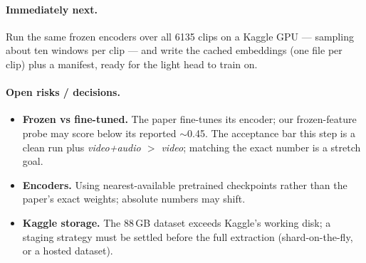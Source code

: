 \documentclass[11pt,a4paper]{article}
\begin{document}
\paragraph{Immediately next.} Run the same frozen encoders over all 6135 clips on a Kaggle
GPU --- sampling about ten windows per clip --- and write the cached embeddings (one file per
clip) plus a manifest, ready for the light head to train on.

\paragraph{Open risks / decisions.}
\begin{itemize}
  \item \textbf{Frozen vs fine-tuned.} The paper fine-tunes its encoder; our frozen-feature
        probe may score below its reported $\sim$0.45. The acceptance bar this step is a clean
        run plus \emph{video+audio $>$ video}; matching the exact number is a stretch goal.
  \item \textbf{Encoders.} Using nearest-available pretrained checkpoints rather than the
        paper's exact weights; absolute numbers may shift.
  \item \textbf{Kaggle storage.} The 88\,GB dataset exceeds Kaggle's working disk; a staging
        strategy must be settled before the full extraction (shard-on-the-fly, or a hosted
        dataset).
\end{itemize}
\end{document}
